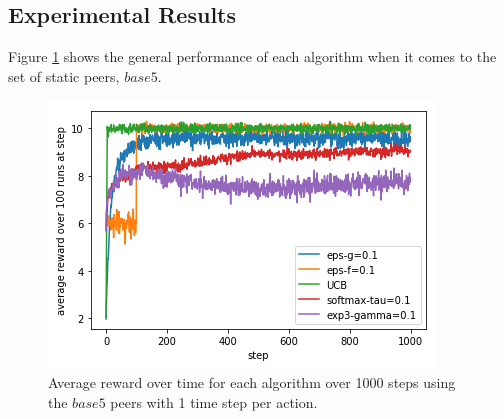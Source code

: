 \documentclass{article}
\begin{document}
\subsection{Experimental Results} 

Figure \ref{fig:base5_1ts_1000step_5algos} shows the general performance of each algorithm when it comes to the set of static peers, $base5$.
\begin{figure}[h]
    \centering
    \includegraphics[width=1\linewidth]{figs/base5_1ts_1000step_5algos.png}
    \caption{Average reward over time for each algorithm over 1000 steps using the $base5$ peers with 1 time step per action.}
    \label{fig:base5_1ts_1000step_5algos}
\end{figure}
\end{document}
